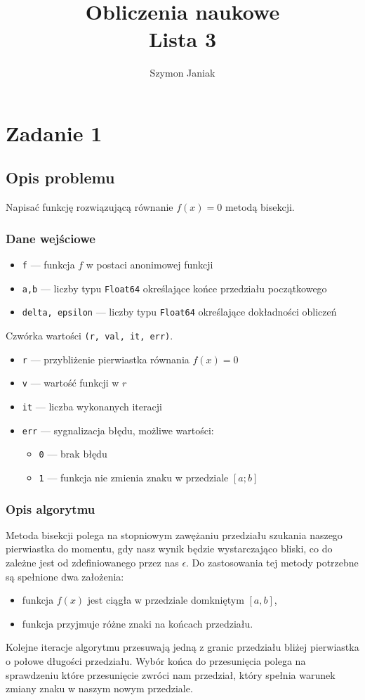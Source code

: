\documentclass{article}
\title{%
	Obliczenia naukowe \\
	\large Lista 3}
\author{Szymon Janiak}
\begin{document}
\maketitle

\section*{Zadanie 1}
\subsection*{Opis problemu}
	Napisać funkcję rozwiązującą równanie $f(x) = 0$ metodą bisekcji.
\subsubsection*{Dane wejściowe}
	\begin{itemize}
	    \item \texttt{f} — funkcja $f$ w postaci anonimowej funkcji
	    \item \texttt{a,b} — liczby typu \texttt{Float64} określające końce przedziału początkowego
	    \item \texttt{delta, epsilon} — liczby typu \texttt{Float64} określające dokładności obliczeń
	\end{itemize}
	Czwórka wartości \texttt{(r, val, it, err)}.
	\begin{itemize}
	    \item \texttt{r} — przybliżenie pierwiastka równania $f(x) = 0$
	    \item \texttt{v} — wartość funkcji w $r$
	    \item \texttt{it} — liczba wykonanych iteracji
	    \item \texttt{err} — sygnalizacja błędu, możliwe wartości:
	    \begin{itemize}
	        \item \texttt{0} — brak błędu
	        \item \texttt{1} — funkcja nie zmienia znaku w przedziale $[a;b]$
	    \end{itemize}
	\end{itemize}
\subsubsection*{Opis algorytmu}
	Metoda bisekcji polega na stopniowym zawężaniu przedziału szukania naszego pierwiastka do momentu, gdy nasz wynik będzie wystarczająco bliski, co do zależne jest od zdefiniowanego przez nas $\epsilon$.
	Do zastosowania tej metody potrzebne są spełnione dwa założenia:
	\begin{itemize}
		\item funkcja \texttt{$f(x)$} jest ciągła w przedziale domkniętym $[a, b]$,
		\item funkcja przyjmuje różne znaki na końcach przedziału.
	\end{itemize}
	Kolejne iteracje algorytmu przesuwają jedną z granic przedziału bliżej pierwiastka o połowe długości przedziału. Wybór końca do przesunięcia polega na sprawdzeniu które przesunięcie zwróci nam przedział, który spełnia warunek zmiany znaku w naszym nowym przedziale.
\end{document}
